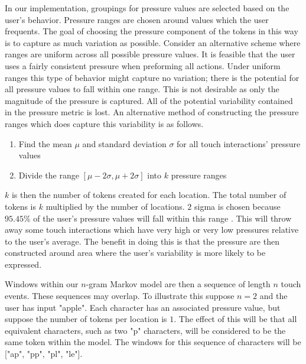 In our implementation,
groupings for pressure values are selected based on the user's behavior.
Pressure ranges are chosen around values which the user frequents.
The goal of choosing 
the pressure component of the
tokens in this way is to capture
as much variation as possible.
%
Consider an alternative scheme where ranges are
uniform across all possible pressure values.
It is feasible that the user uses a fairly consistent
pressure when preforming all actions.
Under uniform ranges this type of behavior might 
capture no variation; there is the potential
for all pressure values to fall within one range.
%
This is not desirable as 
only the magnitude of the pressure is captured.
All of the potential variability contained
in the pressure metric is lost.
%
An alternative method of constructing
the pressure ranges which does capture 
this variability is as follows.
\begin{enumerate}
\item Find the mean $\mu$ and standard deviation $\sigma$ 
  for all touch interactions' pressure values
\item Divide the range $[\mu-2\sigma, \mu+2\sigma]$ into $k$ pressure ranges
\end{enumerate}
%
$k$ is then the number of tokens created for each location.
The total number of tokens is $k$ multiplied by the number of locations.
$2$ sigma is chosen because $95.45\%$ of the user's pressure values
will fall within this range
\cite{threesigmarule}.
%
%
This will throw away some touch interactions
which have very high or very low pressures
relative to the user's average.
%
The benefit in doing this is
that the pressure are then constructed around
area where the user's variability is more likely to be expressed. %

Windows within our $n$-gram Markov model are then
a sequence of length $n$ touch events.
%
These sequences may overlap.
To illustrate this suppose $n = 2$ and the user has input "apple".
Each character has an associated pressure value,
but suppose the number of tokens per location is $1$.
The effect of this will be that all equivalent characters,
such as two "p" characters, 
will be considered to be the same token within the model.
The windows for this sequence of characters will be
["ap", "pp", "pl", "le"].
%

